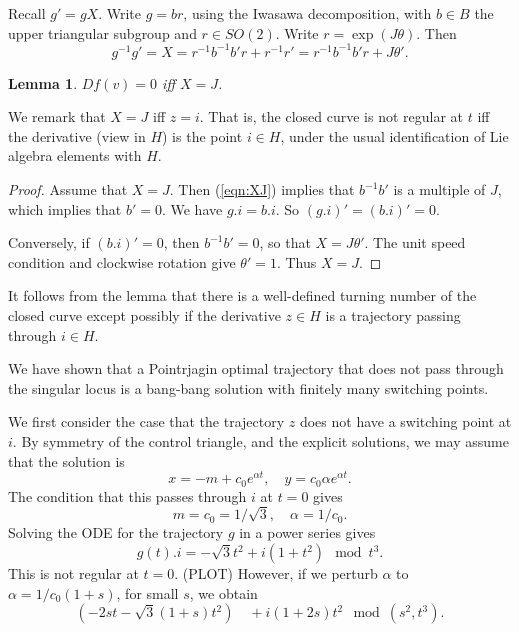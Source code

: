 \documentclass{article}
\newtheorem{lemma}[theorem]{Lemma}
\theoremstyle{remark}
\begin{document}
Recall $g' = g X$.   Write $g = b r$, using the Iwasawa decomposition,
with $b \in B$ the upper triangular subgroup and $r \in SO(2)$.
Write $r = \exp(J\theta)$.
Then
\begin{equation}\label{eqn:XJ}
g^{-1} g' = X= r^{-1} b^{-1} b' r + r^{-1} r' = r^{-1} b^{-1} b' r + J \theta'.
\end{equation}



\begin{lemma}
 $Df(v) = 0$ iff $X = J$. 
\end{lemma}

We remark that $X = J$ iff $z = i$.     That is, the closed curve is not regular at $t$ iff the derivative (view in $H$) is
the point $i\in H$, under the usual identification of Lie algebra elements with $H$.

\begin{proof}
Assume that $X=J$.  Then (\ref{eqn:XJ}) implies that $b^{-1} b'$ is a multiple of $J$, which implies that $b'=0$.
We have $g.i = b.i$.  So $(g.i)' = (b.i)'  =0$.    

Conversely, if $(b.i)'=0$, then $b^{-1} b'=0$, so that $X = J\theta'$.  The unit speed condition and clockwise rotation
give $\theta'=1$.  Thus $X=J$.
\end{proof}

It follows from the lemma that there is a well-defined turning number of the closed curve except possibly if the
derivative $z\in H$ is a trajectory passing through $i\in H$.

We have shown that a Pointrjagin optimal trajectory that does not pass through the singular locus is a bang-bang
solution with finitely many switching points.  

We first consider the case that the trajectory $z$ does not have a switching point at $i$.
By symmetry of the control triangle, and the explicit solutions, we may assume that the solution is
\[
x = -m + c_0 e^{\alpha t},\quad y = c_0 \alpha e^{\alpha t}.
\]
The condition that this passes through $i$ at $t=0$ gives 
\[
m= c_0=1/\sqrt{3},\quad  \alpha = 1/c_0.
\]
Solving the ODE for the trajectory $g$ in a power series gives
\[
g(t).i  = -\sqrt{3} t^2 + i (1 + t^2) \mod t^3. 
\] 
This is not regular at $t=0$. (PLOT)
However, if we perturb $\alpha$ to $\alpha = 1/c_0(1+ s)$, for small $s$, we obtain
\[
(-2 s t  -\sqrt{3} (1+s)t^2)  \quad + i (1 + 2 s) t^2 \mod (s^2,t^3).
\]











 

\end{document}
